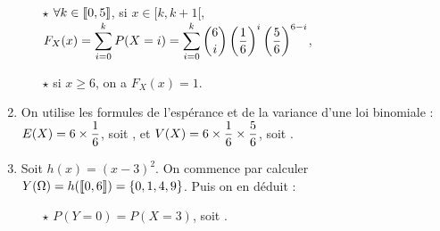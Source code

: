 \documentclass[a4paper, 11pt,reqno]{article}
\begin{document}
\begin{correction}
\begin{enumerate}
\begin{itemize}
			      \item[$\star$] $\forall k \in \llbracket 0,5\rrbracket$, si $x \in [k,k+1[$, $F_X(x) = \displaystyle \sum\limits_{i=0}^k P(X =i) =  \sum\limits_{i=0}^k \binom{6}{i} \left(\frac{1}{6}\right)^i \left(\frac{5}{6}\right)^{6-i}$,
			      \item[$\star$] si $x\geq 6$, on a $F_X(x) = 1$.
		      \end{itemize}
		\item On utilise les formules de l'esp\'erance et de la variance d'une loi binomiale : $E(X)=6\times\displaystyle\frac{1}{6}$, soit , et $V(X) = 6 \times \displaystyle\frac{1}{6}\times \frac{5}{6}$, soit .
		\item Soit $h(x) = (x-3)^2$. On commence par calculer $Y(\Omega) = h(\llbracket 0,6\rrbracket) = \{0,1,4,9\}$. Puis on en d\'eduit :
		      \begin{itemize}
			      \item[$\star$] $P(Y=0) = P(X=3)$, soit .

\end{itemize}
\end{enumerate}
\end{correction}
\end{document}
